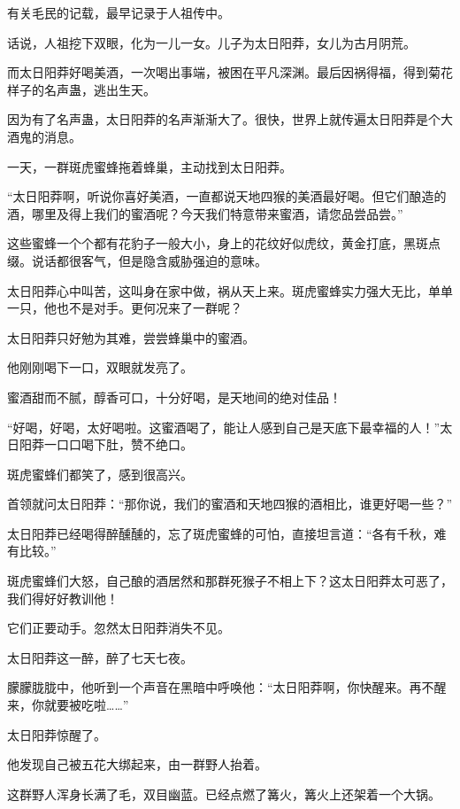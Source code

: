
\begin{this_body}

有关毛民的记载，最早记录于人祖传中。

话说，人祖挖下双眼，化为一儿一女。儿子为太日阳莽，女儿为古月阴荒。

而太日阳莽好喝美酒，一次喝出事端，被困在平凡深渊。最后因祸得福，得到菊花样子的名声蛊，逃出生天。

因为有了名声蛊，太日阳莽的名声渐渐大了。很快，世界上就传遍太日阳莽是个大酒鬼的消息。

一天，一群斑虎蜜蜂拖着蜂巢，主动找到太日阳莽。

“太日阳莽啊，听说你喜好美酒，一直都说天地四猴的美酒最好喝。但它们酿造的酒，哪里及得上我们的蜜酒呢？今天我们特意带来蜜酒，请您品尝品尝。”

这些蜜蜂一个个都有花豹子一般大小，身上的花纹好似虎纹，黄金打底，黑斑点缀。说话都很客气，但是隐含威胁强迫的意味。

太日阳莽心中叫苦，这叫身在家中做，祸从天上来。斑虎蜜蜂实力强大无比，单单一只，他也不是对手。更何况来了一群呢？

太日阳莽只好勉为其难，尝尝蜂巢中的蜜酒。

他刚刚喝下一口，双眼就发亮了。

蜜酒甜而不腻，醇香可口，十分好喝，是天地间的绝对佳品！

“好喝，好喝，太好喝啦。这蜜酒喝了，能让人感到自己是天底下最幸福的人！”太日阳莽一口口喝下肚，赞不绝口。

斑虎蜜蜂们都笑了，感到很高兴。

首领就问太日阳莽：“那你说，我们的蜜酒和天地四猴的酒相比，谁更好喝一些？”

太日阳莽已经喝得醉醺醺的，忘了斑虎蜜蜂的可怕，直接坦言道：“各有千秋，难有比较。”

斑虎蜜蜂们大怒，自己酿的酒居然和那群死猴子不相上下？这太日阳莽太可恶了，我们得好好教训他！

它们正要动手。忽然太日阳莽消失不见。

太日阳莽这一醉，醉了七天七夜。

朦朦胧胧中，他听到一个声音在黑暗中呼唤他：“太日阳莽啊，你快醒来。再不醒来，你就要被吃啦……”

太日阳莽惊醒了。

他发现自己被五花大绑起来，由一群野人抬着。

这群野人浑身长满了毛，双目幽蓝。已经点燃了篝火，篝火上还架着一个大锅。


\end{this_body}
